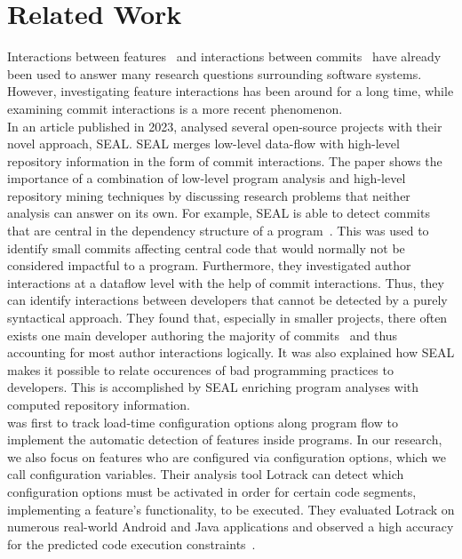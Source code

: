 \chapter{Related Work}\label{ch:related_work}

Interactions between features~\cite{lillack2014tracking,kolesnikov2017relation} and interactions between commits~\cite{sattler2023seal} have already been used to answer many research questions surrounding software systems.
However, investigating feature interactions has been around for a long time, while examining commit interactions is a more recent phenomenon. \\
In an article published in 2023, \citet{sattler2023seal} analysed several open-source projects with their novel approach, SEAL.
SEAL merges low-level data-flow with high-level repository information in the form of commit interactions.
The paper shows the importance of a combination of low-level program analysis and high-level repository mining techniques by discussing research problems that neither analysis can answer on its own.
For example, SEAL is able to detect commits that are central in the dependency structure of a program~\cite{sattler2023seal}.
This was used to identify small commits affecting central code that would normally not be considered impactful to a program.
Furthermore, they investigated author interactions at a dataflow level with the help of commit interactions.
Thus, they can identify interactions between developers that cannot be detected by a purely syntactical approach.
They found that, especially in smaller projects, there often exists one main developer authoring the majority of commits~\cite{sattler2023seal} and thus accounting for most author interactions logically. 
It was also explained how SEAL makes it possible to relate occurences of bad programming practices to developers. 
This is accomplished by SEAL enriching program analyses with computed repository information. \\
\citet{lillack2014tracking} was first to track load-time configuration options along program flow to implement the automatic detection of features inside programs.
In our research, we also focus on features who are configured via configuration options, which we call configuration variables. 
Their analysis tool Lotrack can detect which configuration options must be activated in order for certain code segments, implementing a feature's functionality, to be executed.
They evaluated Lotrack on numerous real-world Android and Java applications and observed a high accuracy for the predicted code execution constraints~\cite{lillack2014tracking}.

